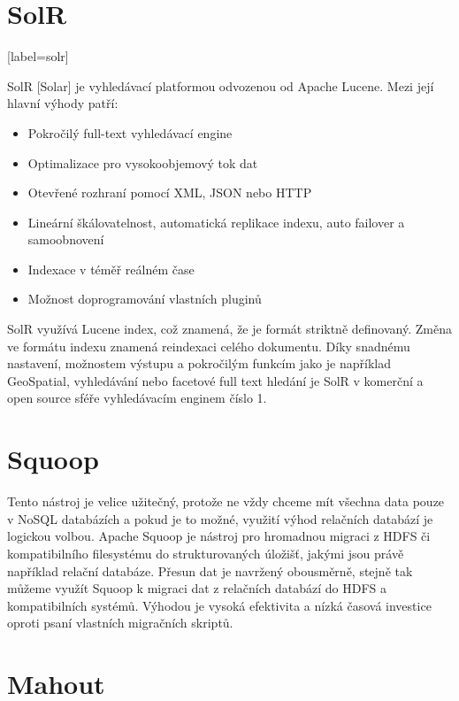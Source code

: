 \section{SolR}[label=solr]

SolR [Solar] je vyhledávací platformou odvozenou od Apache Lucene. Mezi její hlavní výhody patří:

\begin{itemize}
\item Pokročilý full-text vyhledávací engine
\item Optimalizace pro vysokoobjemový tok dat
\item Otevřené rozhraní pomocí XML, JSON nebo HTTP
\item Lineární škálovatelnost, automatická replikace indexu, auto failover a samoobnovení
\item Indexace v téměř reálném čase
\item Možnost doprogramování vlastních pluginů
\end{itemize}

SolR využívá Lucene index, což znamená, že je formát striktně definovaný. Změna ve formátu indexu znamená reindexaci celého dokumentu. Díky snadnému nastavení, možnostem výstupu a pokročilým funkcím jako je například GeoSpatial, vyhledávání nebo facetové full text hledání je SolR v komerční a open source sféře vyhledávacím enginem číslo 1.


\section{Squoop}

Tento nástroj je velice užitečný, protože ne vždy chceme mít všechna data pouze v NoSQL databázích a pokud je to možné, využití výhod relačních databází je logickou volbou. Apache Squoop je nástroj pro hromadnou migraci z HDFS či kompatibilního filesystému do strukturovaných úložišť, jakými jsou právě například relační databáze. Přesun dat je navržený obousměrně, stejně tak můžeme využít Squoop k migraci dat z relačních databází do HDFS a kompatibilních systémů. Výhodou je vysoká efektivita a nízká časová investice oproti psaní vlastních migračních skriptů.

\section{Mahout}

